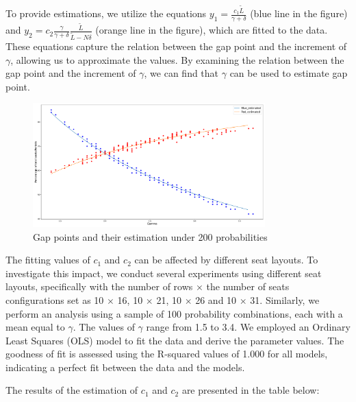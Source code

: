 To provide estimations, we utilize the equations $y_1 = \frac{c_1 \tilde{L}}{\gamma + \delta}$ (blue line in the figure) and $y_2 = c_2 \frac{\gamma}{\gamma + \delta} \frac{\tilde{L}}{\tilde{L}-N \delta}$ (orange line in the figure), which are fitted to the data. These equations capture the relation between the gap point and the increment of $\gamma$, allowing us to approximate the values. By examining the relation between the gap point and the increment of $\gamma$, we can find that $\gamma$ can be used to estimate gap point.

\begin{figure}[ht]
  \centering
    \includegraphics[width=0.8\textwidth]{./Figures/gamma_estimation.pdf}
  \caption{Gap points and their estimation under 200 probabilities}
\end{figure}

The fitting values of $c_1$ and $c_2$ can be affected by different seat layouts. To investigate this impact, we conduct several experiments using different seat layouts, specifically with the number of rows $\times$ the number of seats configurations set as 10 $\times$ 16, 10 $\times$ 21, 10 $\times$ 26 and 10 $\times$ 31. Similarly, we perform an analysis using a sample of 100 probability combinations, each with a mean equal to $\gamma$. The values of $\gamma$ range from 1.5 to 3.4. We employed an Ordinary Least Squares (OLS) model to fit the data and derive the parameter values. The goodness of fit is assessed using the R-squared values of 1.000 for all models, indicating a perfect fit between the data and the models.

The results of the estimation of $c_1$ and $c_2$ are presented in the table below:

